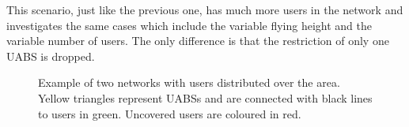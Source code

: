 This scenario, just like the previous one, has much more users in the network 
and investigates the same cases which include the variable flying height and the variable number of  users.
The only difference is that the restriction of only one \gls{UABS} is dropped.
\begin{figure}[!htb]
\hfill
{}
\caption{Example of two networks with users distributed over the area. Yellow triangles represent \acs{UABS}s and are connected 
with black lines to users in green. Uncovered users are coloured in red.}
  \label{radpattern2}
\end{figure}

